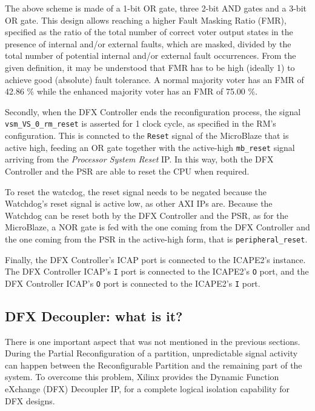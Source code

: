The above scheme \cite{al} is made of a 1-bit OR gate, three 2-bit AND gates and a 3-bit OR gate. This design allows reaching a higher Fault Masking Ratio (FMR), specified as the ratio of the total number of correct voter output states in the presence of internal and/or external faults, which are masked, divided by the total number of potential internal and/or external fault occurrences. From the given definition, it may be understood that FMR has to be high (ideally 1) to achieve good (absolute) fault tolerance. A normal majority voter has an FMR of 42.86 \% while the enhanced majority voter has an FMR of 75.00 \%.\bigskip

Secondly, when the DFX Controller ends the reconfiguration process, the signal \texttt{vsm\_VS\_0\_rm\_reset} is asserted for 1 clock cycle, as specified in the RM's configuration. This is conncted to the \texttt{Reset} signal of the MicroBlaze that is active high, feeding an OR gate together with the active-high \texttt{mb\_reset} signal arriving from the \textit{Processor System Reset} IP. In this way, both the DFX Controller and the PSR are able to reset the CPU when required. \bigskip

To reset the watcdog, the reset signal needs to be negated because the Watchdog's reset signal is active low, as other AXI IPs are. Because the Watchdog can be reset both by the DFX Controller and the PSR, as for the MicroBlaze, a NOR gate is fed with the one coming from the DFX Controller and the one coming from the PSR in the active-high form, that is \texttt{peripheral\_reset}.\bigskip

Finally, the DFX Controller's ICAP port is connected to the ICAPE2's instance. The DFX Controller ICAP's \texttt{I} port is connected to the ICAPE2's \texttt{O} port, and the DFX Controller ICAP's \texttt{O} port is connected to the ICAPE2's \texttt{I} port.



\subsection{DFX Decoupler: what is it?}
There is one important aspect that was not mentioned in the previous sections. During the Partial Reconfiguration of a partition, unpredictable signal activity can happen between the Reconfigurable Partition and the remaining part of the system. To overcome this problem, Xilinx provides the Dynamic Function eXchange (DFX) Decoupler IP, for a complete logical isolation capability for DFX designs. \bigskip


